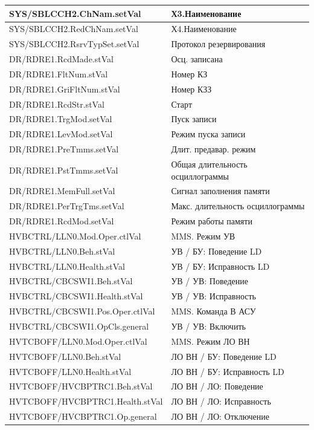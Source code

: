 \begin{longtable}{|>{\raggedright\arraybackslash}m{}|>{\raggedright\arraybackslash}m{}|}
\hline
SYS/SBLCCH2.ChNam.setVal & Х3.Наименование \\
\hline
SYS/SBLCCH2.RedChNam.setVal & Х4.Наименование \\
\hline
SYS/SBLCCH2.RsrvTypSet.setVal & Протокол резервирования \\
\hline
DR/RDRE1.RcdMade.stVal & Осц. записана \\
\hline
DR/RDRE1.FltNum.stVal & Номер КЗ \\
\hline
DR/RDRE1.GriFltNum.stVal & Номер КЗЗ \\
\hline
DR/RDRE1.RcdStr.stVal & Старт \\
\hline
DR/RDRE1.TrgMod.setVal & Пуск записи \\
\hline
DR/RDRE1.LevMod.setVal & Режим пуска записи \\
\hline
DR/RDRE1.PreTmms.setVal & Длит. предавар. режим \\
\hline
DR/RDRE1.PstTmms.setVal & Общая длительность осциллограммы \\
\hline
DR/RDRE1.MemFull.setVal & Сигнал заполнения памяти \\
\hline
DR/RDRE1.PerTrgTms.setVal & Макс. длительность осциллограммы \\
\hline
DR/RDRE1.RcdMod.setVal & Режим работы памяти \\
\hline
HVBCTRL/LLN0.Mod.Oper.ctlVal & MMS. Режим УВ \\
\hline
HVBCTRL/LLN0.Beh.stVal & УВ / БУ: Поведение LD \\
\hline
HVBCTRL/LLN0.Health.stVal & УВ / БУ: Исправность LD \\
\hline
HVBCTRL/CBCSWI1.Beh.stVal & УВ / УВ: Поведение \\
\hline
HVBCTRL/CBCSWI1.Health.stVal & УВ / УВ: Исправность \\
\hline
HVBCTRL/CBCSWI1.Pos.Oper.ctlVal & MMS. Команда В АСУ \\
\hline
HVBCTRL/CBCSWI1.OpCls.general & УВ / УВ: Включить \\
\hline
HVTCBOFF/LLN0.Mod.Oper.ctlVal & MMS. Режим ЛО ВН \\
\hline
HVTCBOFF/LLN0.Beh.stVal & ЛО ВН / БУ: Поведение LD \\
\hline
HVTCBOFF/LLN0.Health.stVal & ЛО ВН / БУ: Исправность LD \\
\hline
HVTCBOFF/HVCBPTRC1.Beh.stVal & ЛО ВН / ЛО: Поведение \\
\hline
HVTCBOFF/HVCBPTRC1.Health.stVal & ЛО ВН / ЛО: Исправность \\
\hline
HVTCBOFF/HVCBPTRC1.Op.general & ЛО ВН / ЛО: Отключение \\

\end{longtable}
